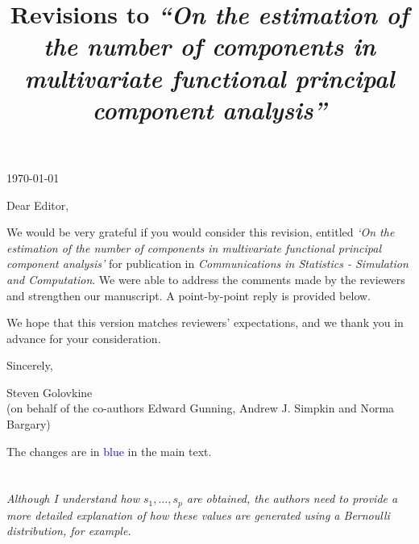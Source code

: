 \documentclass[12pt,a4paper]{article}
\title{\vspace{-1cm}
\begin{flushleft} {\sffamily Revisions to \emph{``On the estimation of the number of components in multivariate functional principal component analysis''}}\end{flushleft}}
\date{\vspace{-1.7cm}\begin{flushleft}\sffamily Steven Golovkine,
Edward Gunning,
Andrew J. Simpkin,
and 
Norma Bargary.
\end{flushleft}}
\newcommand{\comments}[1]{\subsection{}
\begin{mdframed}[style=comments] 
        \textit{#1}
\end{mdframed}}
\begin{document}
\qquad

\qquad

\qquad


\qquad

\qquad

\qquad

\newcommand{\thedate}{\today}

\thedate

\qquad

\qquad

\qquad



Dear Editor,

\qquad


We would be very grateful if you would consider this revision, entitled \emph{`On the estimation of the number of components in multivariate functional principal component analysis'} for publication in \emph{Communications in Statistics - Simulation and Computation}. We were able to address the comments made by the reviewers and strengthen our manuscript. A point-by-point reply is provided below. 

\quad

We hope that this version matches reviewers' expectations, and we thank you in advance for your consideration.



\quad


Sincerely, 

\medskip



 Steven Golovkine 
 \\(on behalf of the co-authors  Edward Gunning, Andrew J. Simpkin and Norma Bargary)





\newpage

\maketitle

\noindent The changes are in \textcolor{blue}{blue} in the main text.
\vspace*{1cm}

\section{}

\comments{Although I understand how $s_1, \dots , s_p$ are obtained, the authors need to provide a more detailed explanation of how these values are generated using a Bernoulli distribution, for example.}
\end{document}
